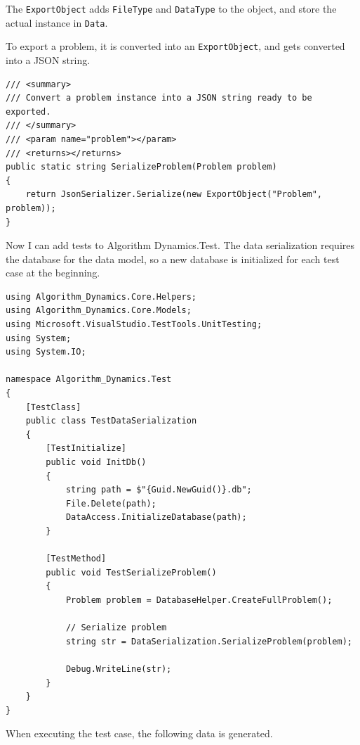 \documentclass[a4paper]{report}
\newcommand{\code}{\texttt}
\begin{document}
The \code{ExportObject} adds \code{FileType} and \code{DataType} to the object, and store the actual instance in \code{Data}.

To export a problem, it is converted into an \code{ExportObject}, and gets converted into a JSON string.

\begin{verbatim}
/// <summary>
/// Convert a problem instance into a JSON string ready to be exported.
/// </summary>
/// <param name="problem"></param>
/// <returns></returns>
public static string SerializeProblem(Problem problem)
{
    return JsonSerializer.Serialize(new ExportObject("Problem", problem));
}
\end{verbatim}

Now I can add tests to Algorithm Dynamics.Test. The data serialization requires the database for the data model, so a new database is initialized for each test case at the beginning.

\begin{verbatim}
using Algorithm_Dynamics.Core.Helpers;
using Algorithm_Dynamics.Core.Models;
using Microsoft.VisualStudio.TestTools.UnitTesting;
using System;
using System.IO;

namespace Algorithm_Dynamics.Test
{
    [TestClass]
    public class TestDataSerialization
    {
        [TestInitialize]
        public void InitDb()
        {
            string path = $"{Guid.NewGuid()}.db";
            File.Delete(path);
            DataAccess.InitializeDatabase(path);
        }

        [TestMethod]
        public void TestSerializeProblem()
        {
            Problem problem = DatabaseHelper.CreateFullProblem();
            
            // Serialize problem
            string str = DataSerialization.SerializeProblem(problem);

            Debug.WriteLine(str);
        }
    }
}
\end{verbatim}

When executing the test case, the following data is generated.
\end{document}
